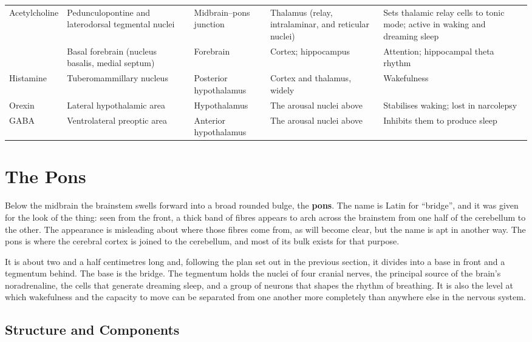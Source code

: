 \documentclass[11pt]{article}
\begin{document}
{\begin{longtable}{L{2.1cm} L{3.1cm} L{2.2cm} L{3.2cm} L{2.6cm}}
\midrule
Acetylcholine & Pedunculopontine and laterodorsal tegmental nuclei & Midbrain--pons junction & Thalamus (relay, intralaminar, and reticular nuclei) & Sets thalamic relay cells to tonic mode; active in waking and dreaming sleep \\
 & Basal forebrain (nucleus basalis, medial septum) & Forebrain & Cortex; hippocampus & Attention; hippocampal theta rhythm \\
\midrule
Histamine & Tuberomammillary nucleus & Posterior hypothalamus & Cortex and thalamus, widely & Wakefulness \\
\midrule
Orexin & Lateral hypothalamic area & Hypothalamus & The arousal nuclei above & Stabilises waking; lost in narcolepsy \\
\midrule
GABA & Ventrolateral preoptic area & Anterior hypothalamus & The arousal nuclei above & Inhibits them to produce sleep \\
\end{longtable}
}


\section{The Pons}

Below the midbrain the brainstem swells forward into a broad rounded bulge, the \textbf{pons}. The name is Latin for ``bridge'', and it was given for the look of the thing: seen from the front, a thick band of fibres appears to arch across the brainstem from one half of the cerebellum to the other. The appearance is misleading about where those fibres come from, as will become clear, but the name is apt in another way. The pons is where the cerebral cortex is joined to the cerebellum, and most of its bulk exists for that purpose.

It is about two and a half centimetres long and, following the plan set out in the previous section, it divides into a base in front and a tegmentum behind. The base is the bridge. The tegmentum holds the nuclei of four cranial nerves, the principal source of the brain's noradrenaline, the cells that generate dreaming sleep, and a group of neurons that shapes the rhythm of breathing. It is also the level at which wakefulness and the capacity to move can be separated from one another more completely than anywhere else in the nervous system.

\subsection{Structure and Components}
\end{document}
